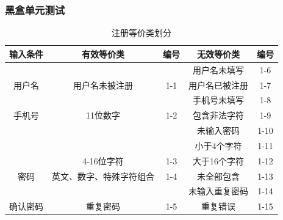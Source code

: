 \documentclass[UTF8,14pt]{article}
\numberwithin{figure}{subsubsection}
\numberwithin{table}{subsubsection}
\begin{document}
\subsubsection{黑盒单元测试}
\begin{table}[H]
	\centering
	\begin{tabular}{|c|c|c|c|c|}
		\hline
		输入条件                   & 有效等价类                       & 编号                  & 无效等价类     & 编号 \\ \hline
		                           &                                  &                       & 用户名未填写   & 1-6  \\ \cline{4-5}
		\multirow{-2}{*}{用户名}   & \multirow{-2}{*}{用户名未被注册} & \multirow{-2}{*}{1-1} & 用户名已被注册 & 1-7  \\ \hline
		                           &                                  &                       & 手机号未填写   & 1-8  \\ \cline{4-5}
		\multirow{-2}{*}{手机号}   & \multirow{-2}{*}{11位数字}       & \multirow{-2}{*}{1-2} & 包含非法字符   & 1-9  \\ \hline
		                           &                                  &                       & 未输入密码     & 1-10 \\ \cline{4-5}
		                           &                                  &                       & 小于4个字符    & 1-11 \\ \cline{4-5}
		                           & \multirow{-3}{*}{4-16位字符}     & \multirow{-3}{*}{1-3} & 大于16个字符   & 1-12 \\ \cline{2-5}
		\multirow{-4}{*}{密码}     & 英文、数字、特殊字符组合         & 1-4                   & 未全部包含     & 1-13 \\ \hline
		                           &                                  &                       & 未输入重复密码 & 1-14 \\ \cline{4-5}
		\multirow{-2}{*}{确认密码} & \multirow{-2}{*}{重复密码}       & \multirow{-2}{*}{1-5} & 重复错误       & 1-15 \\ \hline
	\end{tabular}
	\caption{注册等价类划分}
\end{table}
\end{document}

